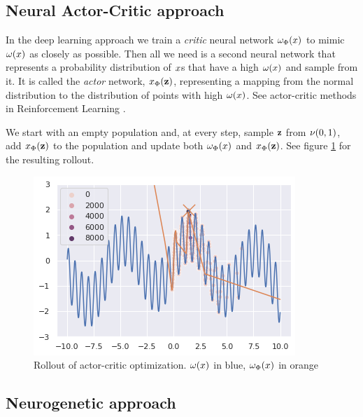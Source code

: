 \subsection{Neural Actor-Critic approach}

In the deep learning approach we train a \emph{critic} neural network $ \omega_{\Phi}(x) $ to mimic $ \omega(x) $ as closely as possible. Then all we need is a second neural network that represents a probability distribution of $ x $s that have a high $ \omega(x) $ and sample from it. It is called the \emph{actor} network, $ x_{\Phi}(\mathbf{z}) $, representing a mapping from the normal distribution to the distribution of points with high $ \omega(x) $. See actor-critic methods in Reinforcement Learning \cite[section 13.5]{suttonReinforcementLearningSecond2018}.

We start with an empty population and, at every step, sample $ \mathbf{z} $ from $ \nu(0,1) $, add $ x_{\Phi}(\mathbf{z}) $ to the population and update both $ \omega_{\Phi}(x) $ and $ x_{\Phi}(\mathbf{z}) $. See figure \ref{fig:neuropt-actor-critic} for the resulting rollout.
    
\begin{figure}
    \centering
    \includegraphics[width=0.8\linewidth]{images/neuropt3.png}
    \caption{Rollout of actor-critic optimization. $ \omega(x) $ in blue, $ \omega_{\Phi}(x) $ in orange}
    \label{fig:neuropt-actor-critic}
\end{figure}


\subsection{Neurogenetic approach}

